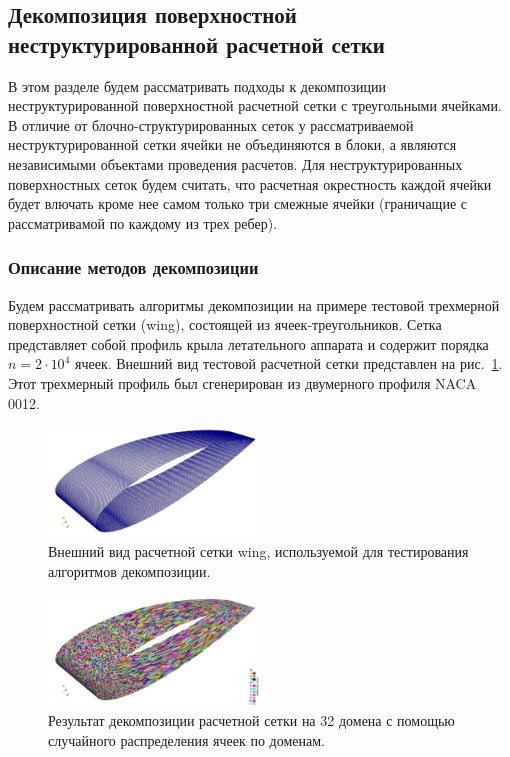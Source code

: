 \subsection{Декомпозиция поверхностной неструктурированной расчетной сетки}

В этом разделе будем рассматривать подходы к декомпозиции неструктурированной поверхностной расчетной сетки с треугольными ячейками.
В отличие от блочно-структурированных сеток у рассматриваемой неструктурированной сетки ячейки не объединяются в блоки, а являются независимыми объектами проведения расчетов.
Для неструктурированных поверхностных сеток будем считать, что расчетная окрестность каждой ячейки будет влючать кроме нее самом только три смежные ячейки (граничащие с рассматривамой по каждому из трех ребер).

\subsubsection{Описание методов декомпозиции}

Будем рассматривать алгоритмы декомпозиции на примере тестовой трехмерной поверхностной сетки (wing), состоящей из ячеек-треугольников.
Сетка представляет собой профиль крыла летательного аппарата и содержит порядка $n = 2 \cdot 10^4$ ячеек.
Внешний вид тестовой расчетной сетки представлен на рис.~\ref{fig:text_2_decompsurf_wing_grid}.
Этот трехмерный профиль был сгенерирован из двумерного профиля NACA 0012.

\begin{figure}[ht]
	\centering
	\includegraphics[width=0.5\textwidth]{./pics/text_2_decompsurf/wing_grid.png}
	\caption{Внешний вид расчетной сетки wing, используемой для тестирования алгоритмов декомпозиции.}
	\label{fig:text_2_decompsurf_wing_grid}
\end{figure}

\begin{figure}[ht]
	\centering
	\includegraphics[width=0.5\textwidth]{./pics/text_2_decompsurf/wing_random_32.png}
	\caption{Результат декомпозиции расчетной сетки на 32 домена с помощью случайного распределения ячеек по доменам.}
	\label{fig:text_2_decompsurf_wing_random_32}
\end{figure}


